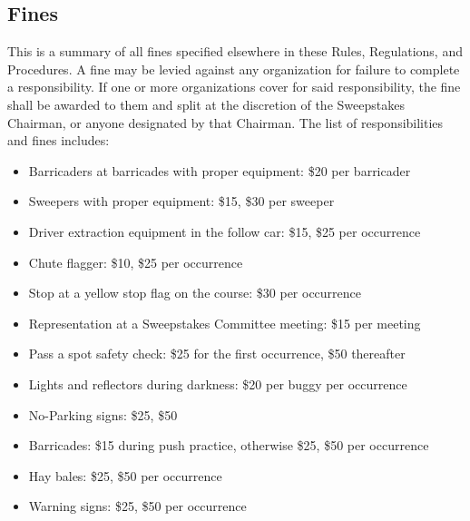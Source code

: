 \begin{appendices}
	\section{Fines}
		This is a summary of all fines specified elsewhere in these Rules, Regulations, 
		and Procedures. A fine may be levied against any organization for failure to complete
		a responsibility. If one or more organizations cover for said responsibility, the fine
		shall be awarded to them and split at the discretion of the Sweepstakes Chairman, or 
		anyone designated by that Chairman. The list of responsibilities and fines includes:

		\begin{itemize}

			\item Barricaders at barricades with proper equipment: \$20 per barricader
			
			\item Sweepers with proper equipment: \$15, \$30 per sweeper
			
			\item Driver extraction equipment in the follow car: \$15, \$25 per occurrence
			
			\item Chute flagger: \$10, \$25 per occurrence
			
			\item Stop at a yellow stop flag on the course: \$30 per occurrence

			\item Representation at a Sweepstakes Committee meeting: \$15 per meeting

			\item Pass a spot safety check: \$25 for the first occurrence, \$50 thereafter
			
			\item Lights and reflectors during darkness: \$20 per buggy per occurrence

			\item No-Parking signs: \$25, \$50
			
			\item Barricades: \$15 during push practice, otherwise \$25, \$50 per occurrence

			\item Hay bales: \$25, \$50 per occurrence
			
			\item Warning signs: \$25, \$50 per occurrence


\end{itemize}
\end{appendices}
